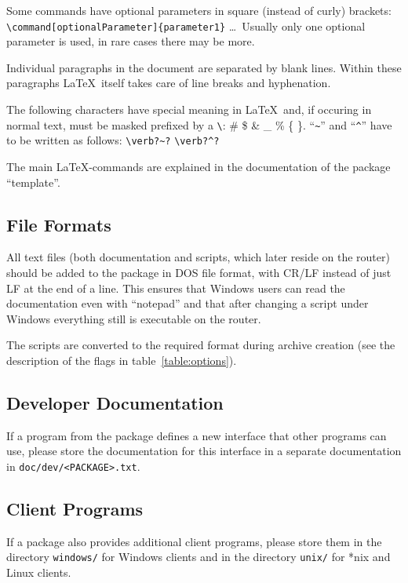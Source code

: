 Some commands have optional parameters in square (instead of curly)
brackets:\\ \verb*?\command[optionalParameter]{parameter1}?
\ldots\ Usually only one optional parameter is used, in
rare cases there may be more.

Individual paragraphs in the document are separated by blank lines.
Within these paragraphs \LaTeX\ itself takes care of line breaks and
hyphenation.

The following characters have special meaning in \LaTeX\ and, if
occuring in normal text, must be masked prefixed by a \verb*?\?:
\# \$ \& \_ \% \{ \}. ``\verb?~?'' and ``\verb?^?'' have to be
written as follows: \verb!\verb?~?! \verb!\verb?^?!

The main \LaTeX-commands are explained in the documentation of the
package ``template''.

\subsection{File Formats}

    All text files (both documentation and scripts, which later reside on
    the router) should be added to the package in DOS file format, with
    CR/LF instead of just LF at the end of a line. This ensures that Windows
    users can read the documentation even with ``notepad'' and that after changing
    a script under Windows everything still is executable on the router.

    The scripts are converted to the required format during archive creation
    (see the description of the flags in table~\ref{table:options}).

\subsection{Developer Documentation}

    If a program from the package defines a new interface that other programs
    can use, please store the documentation for this interface in a separate
    documentation in \texttt{doc/dev/<PACKAGE>.txt}.

\subsection{Client Programs}

    If a package also provides additional client programs, please store them
    in the directory \texttt{windows/} for Windows clients and in the directory
    \texttt{unix/} for *nix and Linux clients.

